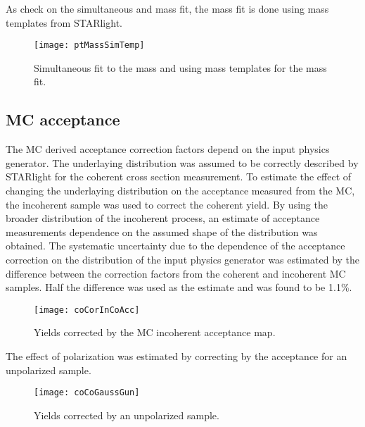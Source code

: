      As check on the simultaneous \pt{} and mass fit, the mass fit is done
        using mass templates from STARlight.
      \begin{figure}[!Hhbt]
        \centering
        \texttt{[image: ptMassSimTemp]}
        \caption{Simultaneous fit to the mass and \pt{} using mass templates
          for the mass fit. }
        \label{fig:simFitTemp}
      \end{figure}

    \subsection{MC acceptance}
      The MC derived acceptance correction factors depend on the input physics
        generator. 
      The underlaying \pt{} distribution was assumed to be correctly 
        described by STARlight for the coherent cross section measurement.
      To estimate the effect of changing the underlaying \pt{} distribution 
        on the acceptance measured from the MC, the incoherent sample was used 
        to correct the coherent yield.
      By using the broader \pt{} distribution of the incoherent process, an 
        estimate of acceptance measurements dependence on the assumed shape of
        the \pt{} distribution was obtained.
      The systematic uncertainty due to the dependence of the acceptance 
        correction on the \pt{} distribution of the input physics generator
        was estimated by the difference between the correction factors from 
        the coherent and incoherent MC samples. 
      Half the difference was used as the estimate and was found to be 1.1\%.

      \begin{figure}[!Hhbt]
        \centering
        \texttt{[image: coCorInCoAcc]}
        \caption{Yields corrected by the MC incoherent acceptance map.}
        \label{fig:coYieldInCoCor}
      \end{figure}

      The effect of polarization was estimated by correcting by the acceptance
        for an unpolarized \JPsi{} sample.
      \begin{figure}[!Hhtb]
        \centering
        \texttt{[image: coCoGaussGun]}
        \caption{Yields corrected by an unpolarized \JPsi{} sample.}
        \label{fig:coYieldGaussCor}
      \end{figure}

